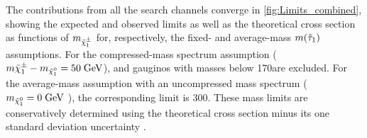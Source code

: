 The contributions from all the search channels converge in \autoref{fig:Limits_combined}, showing the expected and observed limits as well as the theoretical cross section as functions of $m_{\tilde{\chi}^{\pm}_{1}}$ for, respectively, the fixed- and average-mass $m(\tilde{\tau}_{1})$ assumptions. For the compressed-mass spectrum assumption ($m{\tilde{\chi}^{\pm}_{1}} - m_{\tilde{\chi}^{0}_{1}} = 50\;\text{Ge}\kern-0.06667em\text{V}$), \neutralinotwo and \charginopm gauginos with masses below 170\gev are excluded. For the average-mass assumption with an uncompressed mass spectrum ($m_{\tilde{\chi}^{0}_{1}} = 0\;\text{Ge}\kern-0.06667em\text{V}$ ), the corresponding limit is 300\gev. These mass limits are conservatively determined using the theoretical cross section minus its one standard deviation uncertainty \cite{Khachatryan:2015kxa}. 